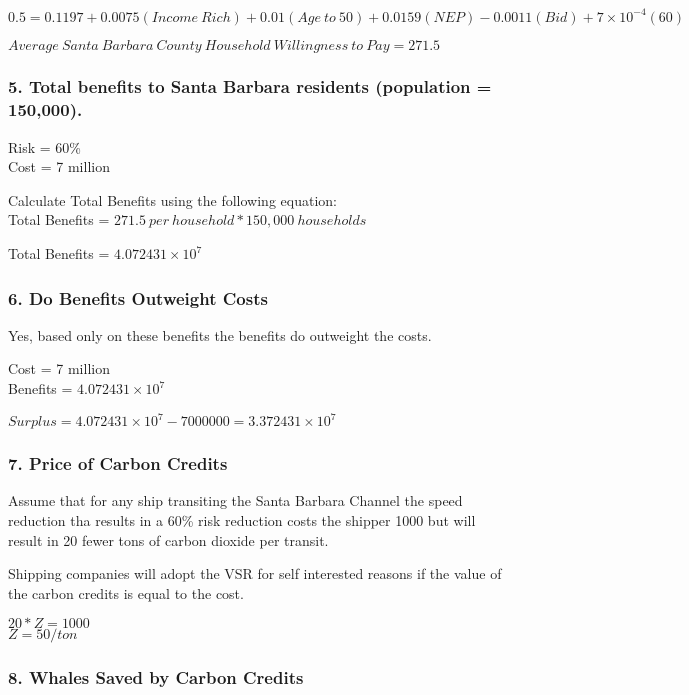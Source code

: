 \documentclass[10pt,]{article}
\begin{document}
\(0.5 = 0.1197 + 0.0075(Income~Rich) + 0.01(Age~to~50) + 0.0159(NEP) - 0.0011(Bid) + 7\times 10^{-4}(60)\)

\(Average~Santa~Barbara~County~Household~Willingness~to~Pay = 271.5\)

\subsubsection{5. Total benefits to Santa Barbara residents (population
=
150,000).}\label{total-benefits-to-santa-barbara-residents-population-150000.}

Risk = 60\%\\
Cost = 7 million

Calculate Total Benefits using the following equation:\\
Total Benefits = \(271.5~per~household * 150,000~households\)

Total Benefits = \(4.072431\times 10^{7}\)

\subsubsection{6. Do Benefits Outweight
Costs}\label{do-benefits-outweight-costs}

Yes, based only on these benefits the benefits do outweight the costs.

Cost = 7 million\\
Benefits = \(4.072431\times 10^{7}\)

\(Surplus = 4.072431\times 10^{7} - 7000000 = 3.372431\times 10^{7}\)

\subsubsection{7. Price of Carbon
Credits}\label{price-of-carbon-credits}

Assume that for any ship transiting the Santa Barbara Channel the speed
reduction tha results in a 60\% risk reduction costs the shipper 1000
but will result in 20 fewer tons of carbon dioxide per transit.

Shipping companies will adopt the VSR for self interested reasons if the
value of the carbon credits is equal to the cost.

\(20*Z = 1000\)\\
\(Z = 50/ton\)

\subsubsection{8. Whales Saved by Carbon
Credits}\label{whales-saved-by-carbon-credits}
\end{document}
